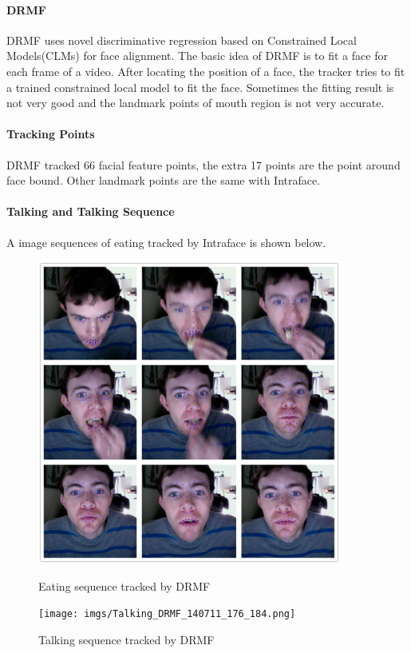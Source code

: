 \paragraph{DRMF}
DRMF uses novel discriminative regression based on Constrained Local Models(CLMs) for face alignment. The basic idea of DRMF is to fit a face for each frame of a video. After locating the position of a face, the tracker tries to fit a trained constrained local model to fit the face. Sometimes the fitting result is not very good and the landmark points of mouth region is not very accurate.
\paragraph{Tracking Points}
DRMF tracked 66 facial feature points, the extra 17 points are the point around face bound. Other landmark points are the same with Intraface.
\paragraph{Talking and Talking Sequence}
A image sequences of eating tracked by Intraface is shown below.
\begin{figure}[p]
\centering
\includegraphics[width=100mm]{imgs/Tracking_DRMF_eating.png}
\caption{Eating sequence tracked by DRMF}
\label{fig:DES}
\texttt{[image: imgs/Talking\_DRMF\_140711\_176\_184.png]}
\caption{Talking sequence tracked by DRMF}
\label{fig:DTS}
\end{figure}
\newpage
